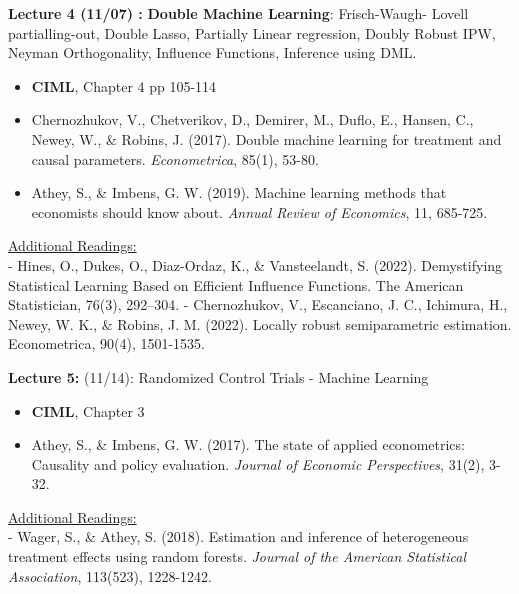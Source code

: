 \documentclass[12pt]{article}
\begin{document}
\vspace{2em}
\noindent\textbf{Lecture 4 (11/07) :} \textbf{Double Machine Learning}: Frisch-Waugh-
Lovell partialling-out, Double Lasso, Partially Linear regression, Doubly Robust IPW, Neyman Orthogonality, Influence Functions, Inference using DML.\\
\vspace{1em}
\begin{itemize}
    \item \textbf{CIML}, Chapter 4 pp 105-114
    \item Chernozhukov, V., Chetverikov, D., Demirer, M., Duflo, E., Hansen, C., Newey, W., \& Robins, J. (2017). Double machine learning for treatment and causal parameters. \textit{Econometrica}, 85(1), 53-80.
    \item Athey, S., \& Imbens, G. W. (2019). Machine learning methods that economists should know about. \textit{Annual Review of Economics}, 11, 685-725.
\end{itemize}
\vspace{1em}
\underline{Additional Readings:} \\
\hspace{1em} - Hines, O., Dukes, O., Diaz-Ordaz, K., \& Vansteelandt, S. (2022). Demystifying Statistical Learning Based on Efficient Influence Functions. The American Statistician, 76(3), 292–304.
\hspace{1em} - Chernozhukov, V., Escanciano, J. C., Ichimura, H., Newey, W. K., \& Robins, J. M. (2022). Locally robust semiparametric estimation. Econometrica, 90(4), 1501-1535.


\vspace{2em}
\noindent\textbf{Lecture 5:} (11/14): Randomized Control Trials - Machine Learning \\
\vspace{1em}
\begin{itemize}
    \item \textbf{CIML}, Chapter 3
    \item Athey, S., \& Imbens, G. W. (2017). The state of applied econometrics: Causality and policy evaluation. \textit{Journal of Economic Perspectives}, 31(2), 3-32.
\end{itemize}
\vspace{1em}
\underline{Additional Readings:} \\
\hspace{1em} - Wager, S., \& Athey, S. (2018). Estimation and inference of heterogeneous treatment effects using random forests. \textit{Journal of the American Statistical Association}, 113(523), 1228-1242.
\end{document}
